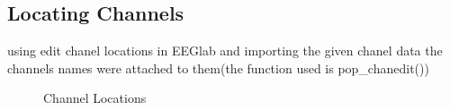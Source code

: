 \documentclass[11pt]{article}
\begin{document}
\subsection{Locating Channels}
using edit chanel locations in EEGlab and importing the given chanel data
the channels names were attached to them(the function used is pop\_chanedit()) \\

\begin{figure}[H]
    \begin{minipage}{.5\textwidth}
    \end{minipage}
    \hfill    
    \begin{minipage}{.5\textwidth}
    \end{minipage}
        \caption{Channel Locations}\label{fig:clocs2d}
\end{figure}
\end{document}
